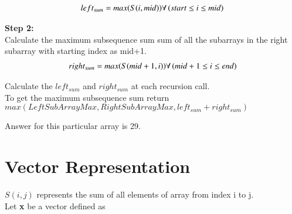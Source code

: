 \documentclass[journal,12pt,twocolumn]{IEEEtran}
\begin{document}
\begin{align}
    left_{sum} = max(S(i,mid)) \forall \left(start \le i \le mid \right)    
\end{align}

\textbf{Step 2:}\\
Calculate the maximum subsequence sum sum of all the subarrays in the right subarray with starting index as mid+1.
\begin{align}
    right_{sum} = max(S(mid+1,i))  \forall \left(mid+1 \le i \le end \right)
\end{align}

Calculate the $left_{sum}$ and $right_{sum}$ at each recursion call.\\
To get the maximum subsequence sum return $max(LeftSubArrayMax,RightSubArrayMax,left_{sum}+right_{sum})$ 

\begin{figure}[!ht]
    \begin{center}
		\resizebox{\columnwidth}{!}{}
	\end{center}
\caption{}
\label{fig:ee18btech11035_block}
\end{figure}

Answer for this particular array is 29.

\section{Vector Representation}

$S(i,j)$ represents the sum of all elements of array from index i to j.\\

Let \textbf{x} be a vector defined as \\
\newcommand{\noleftdelimiter}{\left.\kern-\nulldelimiterspace}
\end{document}
